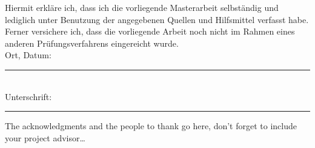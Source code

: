 \documentclass[
11pt, %
english, %
singlespacing, %
headsepline, %
consistentlayout, %
]{MastersDoctoralThesis} %
\begin{document}
\begin{declaration}
	\addchaptertocentry{\authorshipname} %

Hiermit erkläre ich, dass ich die vorliegende Masterarbeit selbständig und lediglich unter Benutzung der angegebenen Quellen und Hilfsmittel verfasst habe. Ferner versichere ich, dass die vorliegende Arbeit noch nicht im Rahmen eines anderen Prüfungsverfahrens eingereicht wurde. \\[1cm]
	
	\noindent Ort, Datum:\\
	\rule[0.5em]{25em}{0.5pt} %
	\\[0.5cm]
	\noindent Unterschrift:\\
	\rule[0.5em]{25em}{0.5pt} %
\end{declaration}



\begin{acknowledgements}
	\addchaptertocentry{\acknowledgementname} %
	The acknowledgments and the people to thank go here, don't forget to include your project advisor\ldots
\end{acknowledgements}
\end{document}
